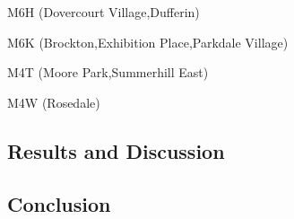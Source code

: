 \documentclass[11pt]{article}
\begin{document}
M6H (Dovercourt Village,Dufferin)

M6K (Brockton,Exhibition Place,Parkdale Village)

M4T (Moore Park,Summerhill East)

M4W (Rosedale)

    \subsection{Results and Discussion }\label{results-and-discussion}

    \subsection{Conclusion }\label{conclusion}


    
    
    
    
\end{document}

